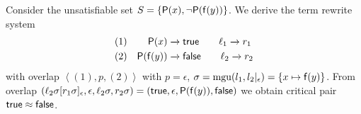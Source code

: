 \begin{example}
	Consider the unsatisfiable set $S = \{ \mathsf{P}(x), \lnot \mathsf{P}(\mathsf{f}(y)) \}$.
	We derive the term rewrite system
	\begin{align*}
	(1)&&
		\mP(x) &\rwStep \mathsf{true}
		\tag*{$\ell_1 \rwStep r_1$}
		\\
	(2)&&
		\mP(\mf(y)) &\rwStep \mathsf{false}
		\tag*{$\ell_2 \rwStep r_2$}
	\end{align*}
	with overlap $\left<(1),p,(2)\right>$ with $p=\epsilon$,
	$\sigma = \operatorname{mgu}(l_1, l_2|_\epsilon) = \{ x\mapsto \mathsf{f}(y)\}$.
	From overlap $\left(\ell_2\sigma[r_1\sigma]_\epsilon, \epsilon, \ell_2\sigma, r_2\sigma\right)
	= (\mathsf{true}, \epsilon, \mathsf{P}(\mathsf{f}(y)), \mathsf{false})$
	we obtain critical pair $\mathsf{true} \approx \mathsf{false}$.

\end{example}




